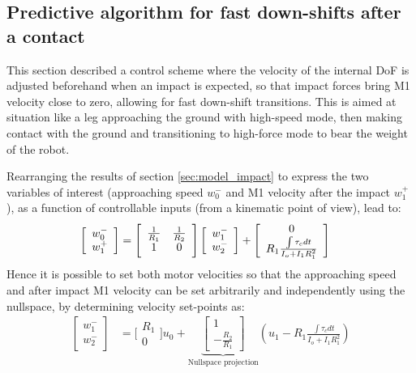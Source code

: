 \subsection{Predictive algorithm for fast down-shifts after a contact}

This section described a control scheme where the velocity of the internal DoF is adjusted beforehand when an impact is expected, so that impact forces bring M1 velocity close to zero, allowing for fast down-shift transitions. This is aimed at situation like a leg approaching the ground with high-speed mode, then making contact with the ground and transitioning to high-force mode to bear the weight of the robot.


Rearranging the results of section \ref{sec:model_impact} to express the two variables of interest (approaching speed $w_0^-$ and M1 velocity after the impact $w_1^+$), as a function of controllable inputs (from a kinematic point of view), lead to:
%
\begin{align}
\left[ \begin{array}{c} w_0^- \\ w_1^+ \end{array} \right] &= \Bigg[ \begin{array}{c c} \frac{1}{R_1} & \frac{1}{R_2}\\ 1 & 0 \end{array} \Bigg] \left[ \begin{array}{c} w_1^- \\ w_2^- \end{array} \right] + \left[ \begin{array}{c} 0 \\ R_1 \frac{\int{\tau_c dt}}{I_o + I_1 R_1^2} \end{array} \right]
\label{eq:dsdm_impact_approx_sol}
\end{align}
%
Hence it is possible to set both motor velocities so that the approaching speed and after impact M1 velocity can be set arbitrarily and independently using the nullspace, by determining velocity set-points as:
%
\begin{align}
\left[ \begin{array}{c} w_1^- \\ w_2^- \end{array} \right] &= \Bigg[ \begin{array}{c} R_1 \\ 0  \end{array} \Bigg] u_0  + 
\underbrace{ \left[ \begin{array}{c} 1 \\ -\frac{R_2}{R_1} \end{array} \right]}_{\text{Nullspace projection}}
 \left( u_1 - R_1 \frac{\int{\tau_c dt}}{I_o + I_1 R_1^2} \right) 
\end{align}
